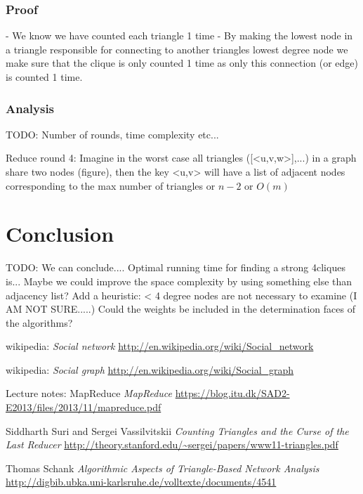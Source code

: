 \documentclass{article}
\begin{document}
\subsubsection{Proof}
- We know we have counted each triangle 1 time
- By making the lowest node in a triangle responsible for connecting to another triangles lowest degree node we make sure that the clique is only counted 1 time as only this connection (or edge) is counted 1 time.



\subsubsection{Analysis}
TODO: Number of rounds, time complexity etc...

Reduce round 4: Imagine in the worst case all triangles ([<u,v,w>],...) in a graph share two nodes (figure), then the key <u,v> will have a list of adjacent nodes corresponding to the max number of triangles or $n-2$ or $O(m)$


\section{Conclusion}
TODO: We can conclude....
Optimal running time for finding a strong 4cliques is...
Maybe we could improve the space complexity by using something else than adjacency list?
Add a heuristic: < 4 degree nodes are not necessary to examine (I AM NOT SURE.....)
Could the weights be included in the determination faces of the algorithms?

\begin{thebibliography}{1}

    wikipedia:
    \emph{Social network}
    \url{http://en.wikipedia.org/wiki/Social_network}

    wikipedia:
    \emph{Social graph}
    \url{http://en.wikipedia.org/wiki/Social_graph}

    Lecture notes: MapReduce
    \emph{MapReduce}
    \url{https://blog.itu.dk/SAD2-E2013/files/2013/11/mapreduce.pdf}

    Siddharth Suri and Sergei Vassilvitskii
    \emph{Counting Triangles and the Curse of the Last Reducer}
    \url{http://theory.stanford.edu/~sergei/papers/www11-triangles.pdf}

    Thomas Schank
    \emph{Algorithmic Aspects of Triangle-Based Network Analysis}
    \url{http://digbib.ubka.uni-karlsruhe.de/volltexte/documents/4541}
    
\end{thebibliography}
\end{document}
